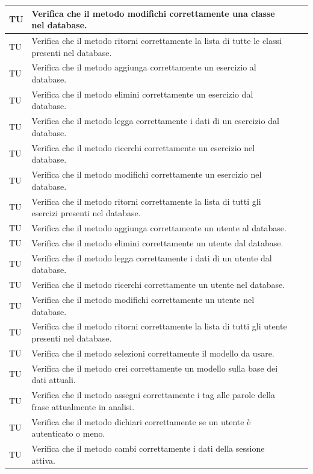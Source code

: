 \begin{longtable}{|>{\centering\arraybackslash}m{1.6cm}|>{\centering\arraybackslash}m{6.41cm}|>{\centering\arraybackslash}m{3.1cm}| c |}
		TU & Verifica che il metodo modifichi correttamente una classe nel database. \\ \hline
		TU & Verifica che il metodo ritorni correttamente la lista di tutte le classi presenti nel database.  \\ \hline	
		TU & Verifica che il metodo aggiunga correttamente un esercizio al database. \\ \hline
		TU & Verifica che il metodo elimini correttamente un esercizio dal database. \\ \hline
		TU & Verifica che il metodo legga correttamente i dati di un esercizio dal database. \\ \hline
		TU & Verifica che il metodo ricerchi correttamente un esercizio nel database. \\ \hline
		TU & Verifica che il metodo modifichi correttamente un esercizio nel database. \\ \hline
		TU & Verifica che il metodo ritorni correttamente la lista di tutti gli esercizi presenti nel database.  \\ \hline	
		TU & Verifica che il metodo aggiunga correttamente un utente al database. \\ \hline
		TU & Verifica che il metodo elimini correttamente un utente dal database. \\ \hline
		TU & Verifica che il metodo legga correttamente i dati di un utente dal database. \\ \hline
		TU & Verifica che il metodo ricerchi correttamente un utente nel database. \\ \hline
		TU & Verifica che il metodo modifichi correttamente un utente nel database. \\ \hline
		TU & Verifica che il metodo ritorni correttamente la lista di tutti gli utente presenti nel database.  \\ \hline
		TU & Verifica che il metodo selezioni correttamente il modello da usare.  \\ \hline
		TU & Verifica che il metodo crei correttamente un modello sulla base dei dati attuali.  \\ \hline
		TU & Verifica che il metodo assegni correttamente i tag alle parole della frase attualmente in analisi.  \\ \hline
		TU & Verifica che il metodo dichiari correttamente se un utente è autenticato o meno.  \\ \hline
		TU & Verifica che il metodo cambi correttamente i dati della sessione attiva.  \\ \hline
		

\end{longtable}

